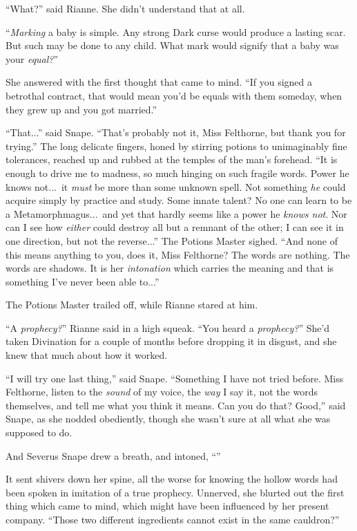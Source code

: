 “What?” said Rianne. She didn’t understand that at all.

“\emph{Marking} a baby is simple. Any strong Dark curse would produce a lasting scar. But such may be done to any child. What mark would signify that a baby was your \emph{equal?}”

She answered with the first thought that came to mind. “If you signed a betrothal contract, that would mean you’d be equals with them someday, when they grew up and you got married.”

“That...” said Snape. “That’s probably not it, Miss Felthorne, but thank you for trying.” The long delicate fingers, honed by stirring potions to unimaginably fine tolerances, reached up and rubbed at the temples of the man’s forehead. “It is enough to drive me to madness, so much hinging on such fragile words. Power he knows not...\ it \emph{must} be more than some unknown spell. Not something \emph{he} could acquire simply by practice and study. Some innate talent? No one can learn to be a Metamorphmagus...\ and yet that hardly seems like a power he \emph{knows not}. Nor can I see how \emph{either} could destroy all but a remnant of the other; I can see it in one direction, but not the reverse...” The Potions Master sighed. “And none of this means anything to you, does it, Miss Felthorne? The words are nothing. The words are shadows. It is her \emph{intonation} which carries the meaning and that is something I’ve never been able to...”

The Potions Master trailed off, while Rianne stared at him.

“A \emph{prophecy?}” Rianne said in a high squeak. “You heard a \emph{prophecy?}” She’d taken Divination for a couple of months before dropping it in disgust, and she knew that much about how it worked.

“I will try one last thing,” said Snape. “Something I have not tried before. Miss Felthorne, listen to the \emph{sound} of my voice, the \emph{way} I say it\emph{,} not the words themselves, and tell me what you think it means. Can you do that? Good,” said Snape, as she nodded obediently, though she wasn’t sure at all what she was supposed to do.

And Severus Snape drew a breath, and intoned, “”

It sent shivers down her spine, all the worse for knowing the hollow words had been spoken in imitation of a true prophecy. Unnerved, she blurted out the first thing which came to mind, which might have been influenced by her present company. “Those two different ingredients cannot exist in the same cauldron?”

